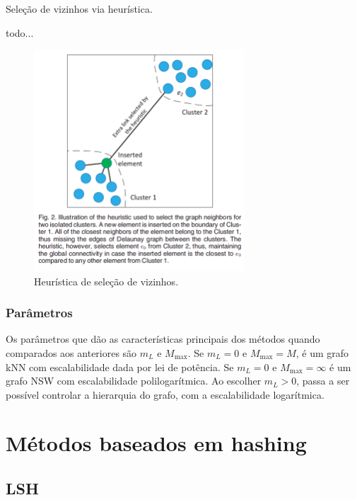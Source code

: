 \begin{algorithm}
\caption{Seleção de vizinhos via heurística.}
\begin{algorithmic}[1]
\State todo...
\EndProcedure
\end{algorithmic}
\end{algorithm}

\begin{figure}
    \centering
    \includegraphics[width=0.7\textwidth]{imgs/hnsw_heuristic.png}
    \caption{Heurística de seleção de vizinhos.}
    \label{fig:hnsw_heuristic}
\end{figure}

\subsubsection{Parâmetros}

Os parâmetros que dão as características principais dos métodos quando comparados aos anteriores são $m_L$ e $M_\text{max}$. Se $m_L=0$ e $M_\text{max}=M$, é um grafo kNN com escalabilidade dada por lei de potência. Se $m_L=0$ e $M_\text{max}=\infty$ é um grafo NSW com escalabilidade polilogarítmica. Ao escolher $m_L>0$, passa a ser possível controlar a hierarquia do grafo, com a escalabilidade logarítmica.

\section{Métodos baseados em hashing}

\subsection{LSH}

